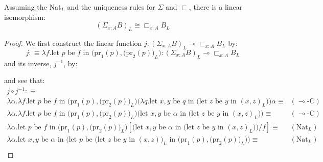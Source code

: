 \documentclass[a4paper,english]{lipics-v2018}
\begin{document}
\begin{theorem}\label{L-subset}
  Assuming the Nat$_L$ and the uniqueness rules for $\Sigma$ and $\sqsubset$, there is a linear isomorphism:
  \[
    (\Sigma_{x :A}B)_L \cong \sqsubset_{x:A}B_L
  \]
  \begin{proof} 
We first construct the linear function $j : (\Sigma_{x :A}B)_L \multimap \sqsubset_{x:A}B_L$ by:\\
\[
  j :\equiv \lambda f. \text{let $p$ be $f$ in $\Big (\text{pr}_1(p), \big  (\text{pr}_2(p)\big )_L\Big)$} : (\Sigma_{x :A}B)_L \multimap \sqsubset_{x :A}B_L
\]
and its inverse, $j^{-1}$, by:
\begin{prooftree}
\end{prooftree}
and see that:
\small
\[
  \begin{split}
    j \circ j^{-1} : \equiv \\
     \lambda \alpha. \lambda f. \text{let $p$ be $f$ in $\Big (\text{pr}_1(p), \big  (\text{pr}_2(p)\big )_L\Big)$} \big (\lambda q. \text{let $x, y$ be $q$ in (let $z$ be $y$ in $(x, z)_L$)} \big ) \alpha \equiv& \quad (\text{$\multimap$-C})\\
    \lambda \alpha. \lambda f. \text{let $p$ be $f$ in $\Big (\text{pr}_1(p), \big  (\text{pr}_2(p)\big )_L\Big)$} \big (\text{let $x, y$ be $\alpha$ in (let $z$ be $y$ in $(x, z)_L$)} \big ) \equiv& \quad (\text{$\multimap$-C})\\
        \lambda \alpha. \text{let $p$ be $f$ in $\Big (\text{pr}_1(p), \big  (\text{pr}_2(p)\big )_L\Big)$} [\big (\text{let $x, y$ be $\alpha$ in (let $z$ be $y$ in $(x, z)_L$)} \big )/f] \equiv& \quad (\text{Nat}_L)\\
    \lambda \alpha. \text{let $x, y$ be $\alpha$ in $\Big ($let $p$ be (let $z$ be $y$ in $(x, z))_L$ in $\Big (\text{pr}_1(p), \big  (\text{pr}_2(p)\big )_L\Big) \Big )$}  \equiv&\quad (\text{Nat}_L)\\

\end{split}\]
\end{proof}
\end{theorem}
\end{document}

